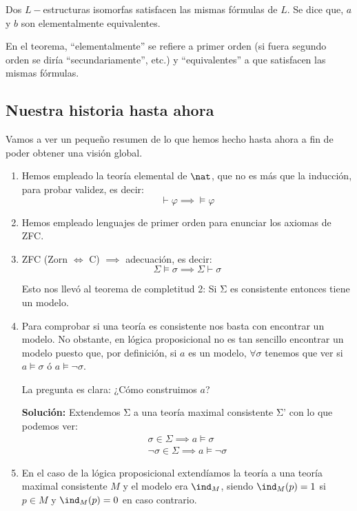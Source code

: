\begin{theorem}
	Dos $L-$estructuras isomorfas satisfacen las mismas fórmulas de $L$. Se dice que, $a$ y $b$ son elementalmente equivalentes.
\end{theorem}
En el teorema, ``elementalmente'' se refiere a primer orden (si fuera segundo orden se diría ``secundariamente'', etc.) y ``equivalentes'' a que satisfacen las mismas fórmulas.

\subsection{Nuestra historia hasta ahora}
Vamos a ver un pequeño resumen de lo que hemos hecho hasta ahora a fin de poder obtener una visión global.

\begin{enumerate}
\item Hemos empleado la teoría elemental de $\nat$, que no es más que la inducción, para probar validez, es decir:
\[\vdash \varphi \implies \vDash \varphi\]

\item Hemos empleado lenguajes de primer orden para enunciar los axiomas de ZFC.

\item ZFC (Zorn $\iff$ C) $\implies$ adecuación, es decir:
\[Σ \models σ \implies Σ \vdash σ\]

\obs Esto nos llevó al teorema de completitud 2: Si Σ es consistente entonces tiene un modelo.

\item Para comprobar si una teoría es consistente nos basta con encontrar un modelo. No obstante, en lógica proposicional no es tan sencillo encontrar un modelo puesto que, por definición, si $a$ es un modelo, $\forall σ$ tenemos que ver si $a \models σ$ ó $a \models \neg σ$.

La pregunta es clara: ¿Cómo construimos $a$?

\textbf{Solución:} Extendemos Σ a una teoría maximal consistente Σ' con lo que podemos ver:
\[\begin{array}{l}σ \in Σ \implies a \models σ \\ \neg σ\in Σ \implies a \models \neg σ\end{array}\]

\item En el caso de la lógica proposicional extendíamos la teoría a una teoría maximal consistente $M$ y el modelo era $\ind_M$, siendo $\ind_M(p)=1$ si $p \in M$ y $\ind_M(p)=0$ en caso contrario.


\end{enumerate}
